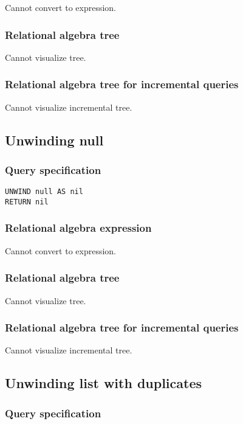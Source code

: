 Cannot convert to expression.

\subsubsection*{Relational algebra tree}

Cannot visualize tree.

\subsubsection*{Relational algebra tree for incremental queries}

Cannot visualize incremental tree.

\subsection{Unwinding null}

\subsubsection*{Query specification}

\begin{lstlisting}
UNWIND null AS nil
RETURN nil
\end{lstlisting}

\subsubsection*{Relational algebra expression}

Cannot convert to expression.

\subsubsection*{Relational algebra tree}

Cannot visualize tree.

\subsubsection*{Relational algebra tree for incremental queries}

Cannot visualize incremental tree.

\subsection{Unwinding list with duplicates}

\subsubsection*{Query specification}

